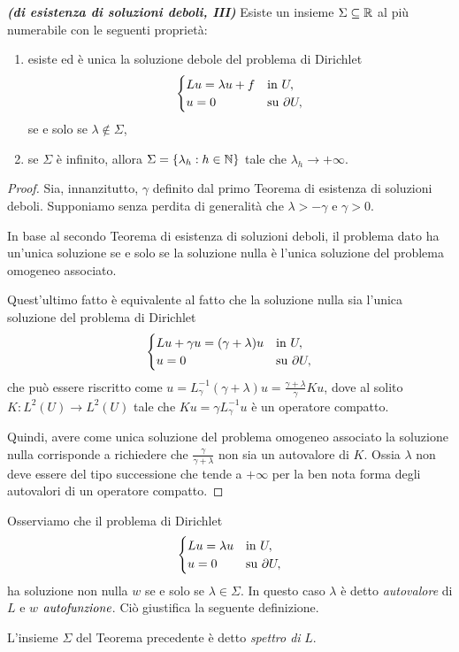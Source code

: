 \begin{teorema}\emph{\textbf{(di esistenza di soluzioni deboli, III)}}
	Esiste un insieme $\Sigma \subseteq \mathbb{R}$ al più numerabile con le seguenti proprietà:
	\begin{enumerate}[$(a)$]
		\item esiste ed è unica la soluzione debole del problema di Dirichlet
		\[ \begin{cases}
			Lu = \lambda u + f & \textup{in } U,\\
			u= 0 & \textup{su } \partial U,
		\end{cases} \]
		se e solo se $\lambda \notin \Sigma$,
		\item se $\Sigma$ è infinito, allora $\Sigma = \left\lbrace \lambda_h: h \in \mathbb{N}\right\rbrace $ tale che $\lambda_h \to +\infty$.
	\end{enumerate}
\end{teorema}
\begin{proof}
	Sia, innanzitutto, $\gamma$ definito dal primo Teorema di esistenza di soluzioni deboli.	Supponiamo senza perdita di generalità che $\lambda > -\gamma $ e $\gamma > 0$. 
	
	In base al secondo Teorema di esistenza di soluzioni deboli, il problema dato ha un'unica soluzione se e solo se la soluzione nulla è l'unica soluzione del problema omogeneo associato.
	
	Quest'ultimo fatto è equivalente al fatto che la soluzione nulla sia l'unica soluzione del problema di Dirichlet
	\[ \begin{cases}
		Lu + \gamma u = (\gamma + \lambda) u & \textup{in } U,\\
		u= 0 & \textup{su } \partial U,
	\end{cases} \]
	che può essere riscritto come $u = L_\gamma^{-1}(\gamma + \lambda)u = \frac{\gamma+\lambda}{\gamma}Ku$, dove al solito  $K: L^2(U) \to L^2(U)$ tale che $Ku= \gamma L^{-1}_\gamma u $ è un operatore compatto. 
	
	Quindi, avere come unica soluzione del problema omogeneo associato la soluzione nulla corrisponde a richiedere che $\frac{\gamma}{\gamma+\lambda}$ non sia un autovalore di $K$. Ossia $\lambda$ non deve essere del tipo successione che tende a $+\infty$ per la ben nota forma degli autovalori di un operatore compatto.
\end{proof}

Osserviamo che il problema di Dirichlet
\[ \begin{cases}
	Lu = \lambda u & \textup{in } U,\\
	u= 0 & \textup{su } \partial U,
\end{cases} \]
ha soluzione non nulla $w$ se e solo se $\lambda \in \Sigma$. In questo caso $\lambda$ è detto \emph{autovalore} di $L$ e $w$ $\emph{autofunzione}$. Ciò giustifica la seguente definizione.
\begin{definizione}
	L'insieme $\Sigma$ del Teorema precedente è detto \emph{spettro di} $L$.
\end{definizione}


